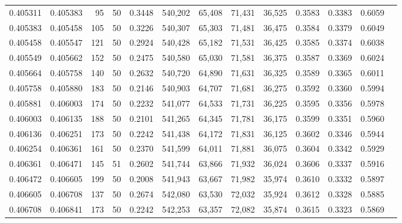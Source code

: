 \begin{tabular}{rrrrrrrrrrrrr}
0.405311 & 0.405383 &    95 &  50 &                                     0.3448 & 540,202 &  65,408 &  71,431 &  36,525 & 0.3583 & 0.3383 & 0.6059 \\
0.405383 & 0.405458 &   105 &  50 &                                     0.3226 & 540,307 &  65,303 &  71,481 &  36,475 & 0.3584 & 0.3379 & 0.6049 \\
0.405458 & 0.405547 &   121 &  50 &                                     0.2924 & 540,428 &  65,182 &  71,531 &  36,425 & 0.3585 & 0.3374 & 0.6038 \\
0.405549 & 0.405662 &   152 &  50 &                                     0.2475 & 540,580 &  65,030 &  71,581 &  36,375 & 0.3587 & 0.3369 & 0.6024 \\
0.405664 & 0.405758 &   140 &  50 &                                     0.2632 & 540,720 &  64,890 &  71,631 &  36,325 & 0.3589 & 0.3365 & 0.6011 \\
0.405758 & 0.405880 &   183 &  50 &                                     0.2146 & 540,903 &  64,707 &  71,681 &  36,275 & 0.3592 & 0.3360 & 0.5994 \\
0.405881 & 0.406003 &   174 &  50 &                                     0.2232 & 541,077 &  64,533 &  71,731 &  36,225 & 0.3595 & 0.3356 & 0.5978 \\
0.406003 & 0.406135 &   188 &  50 &                                     0.2101 & 541,265 &  64,345 &  71,781 &  36,175 & 0.3599 & 0.3351 & 0.5960 \\
0.406136 & 0.406251 &   173 &  50 &                                     0.2242 & 541,438 &  64,172 &  71,831 &  36,125 & 0.3602 & 0.3346 & 0.5944 \\
0.406254 & 0.406361 &   161 &  50 &                                     0.2370 & 541,599 &  64,011 &  71,881 &  36,075 & 0.3604 & 0.3342 & 0.5929 \\
0.406361 & 0.406471 &   145 &  51 &                                     0.2602 & 541,744 &  63,866 &  71,932 &  36,024 & 0.3606 & 0.3337 & 0.5916 \\
0.406472 & 0.406605 &   199 &  50 &                                     0.2008 & 541,943 &  63,667 &  71,982 &  35,974 & 0.3610 & 0.3332 & 0.5897 \\
0.406605 & 0.406708 &   137 &  50 &                                     0.2674 & 542,080 &  63,530 &  72,032 &  35,924 & 0.3612 & 0.3328 & 0.5885 \\
0.406708 & 0.406841 &   173 &  50 &                                     0.2242 & 542,253 &  63,357 &  72,082 &  35,874 & 0.3615 & 0.3323 & 0.5869 \\

\end{tabular}

